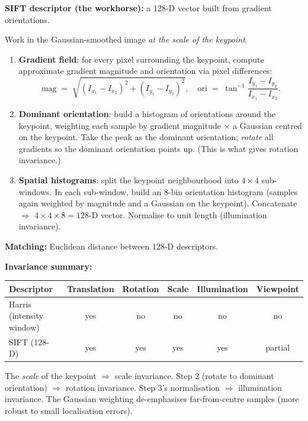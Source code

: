 \textbf{SIFT descriptor (the workhorse):} a 128-D vector built from gradient orientations.

\begin{thmbox}
Work in the Gaussian-smoothed image \emph{at the scale of the keypoint}.
\begin{enumerate}
  \item \textbf{Gradient field}: for every pixel surrounding the keypoint, compute approximate gradient magnitude and orientation via pixel differences:
  \[
  \mathrm{mag} \;=\; \sqrt{(I_{x_1}-I_{x_2})^2 + (I_{y_1}-I_{y_2})^2}, \quad
  \mathrm{ori} \;=\; \tan^{-1}\!\frac{I_{y_1}-I_{y_2}}{I_{x_1}-I_{x_2}}.
  \]
  \item \textbf{Dominant orientation}: build a histogram of orientations around the keypoint, weighting each sample by gradient magnitude $\times$ a Gaussian centred on the keypoint. Take the peak as the dominant orientation; \emph{rotate} all gradients so the dominant orientation points up. (This is what gives rotation invariance.)
  \item \textbf{Spatial histograms}: split the keypoint neighbourhood into $4\times 4$ sub-windows. In each sub-window, build an 8-bin orientation histogram (samples again weighted by magnitude and a Gaussian on the keypoint). Concatenate $\Rightarrow$ $4 \times 4 \times 8 = 128$-D vector. Normalise to unit length (illumination invariance).
\end{enumerate}
\end{thmbox}

\textbf{Matching:} Euclidean distance between 128-D descriptors.

\textbf{Invariance summary:}
\begin{center}
\renewcommand{\arraystretch}{1.3}
\begin{tabular}{@{} l c c c c c @{}}
\toprule
\textbf{Descriptor} & \textbf{Translation} & \textbf{Rotation} & \textbf{Scale} & \textbf{Illumination} & \textbf{Viewpoint} \\
\midrule
Harris (intensity window) & yes & no & no & no & no \\
SIFT (128-D) & yes & yes & yes & yes & partial \\
\bottomrule
\end{tabular}
\end{center}

\begin{tipbox}
The \emph{scale} of the keypoint $\Rightarrow$ scale invariance. Step 2 (rotate to dominant orientation) $\Rightarrow$ rotation invariance. Step 3's normalisation $\Rightarrow$ illumination invariance. The Gaussian weighting de-emphasises far-from-centre samples (more robust to small localisation errors).
\end{tipbox}

